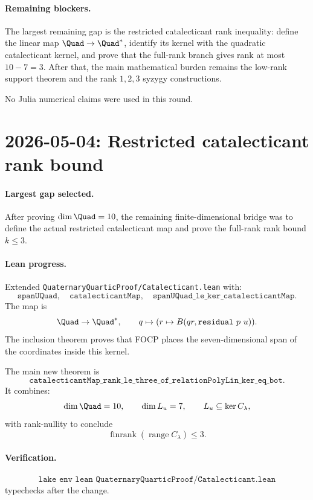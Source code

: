 \documentclass[11pt]{article}
\begin{document}
\paragraph{Remaining blockers.}
The largest remaining gap is the restricted catalecticant rank inequality:
define the linear map \(\Quad\to\Quad^\ast\), identify its kernel with the
quadratic catalecticant kernel, and prove that the full-rank branch gives
rank at most \(10-7=3\).  After that, the main mathematical burden remains
the low-rank support theorem and the rank \(1,2,3\) syzygy constructions.

No Julia numerical claims were used in this round.

\section*{2026-05-04: Restricted catalecticant rank bound}

\paragraph{Largest gap selected.}
After proving \(\dim \Quad=10\), the remaining finite-dimensional bridge was
to define the actual restricted catalecticant map and prove the full-rank
rank bound \(k\le3\).

\paragraph{Lean progress.}
Extended \texttt{QuaternaryQuarticProof/Catalecticant.lean} with:
\[
\texttt{spanUQuad},\quad
\texttt{catalecticantMap},\quad
\texttt{spanUQuad\_le\_ker\_catalecticantMap}.
\]
The map is
\[
  \Quad\to\Quad^\ast,\qquad
  q\mapsto(r\mapsto B(qr,\texttt{residual}\ p\ u)).
\]
The inclusion theorem proves that FOCP places the seven-dimensional span of
the coordinates inside this kernel.

The main new theorem is
\[
\texttt{catalecticantMap\_rank\_le\_three\_of\_relationPolyLin\_ker\_eq\_bot}.
\]
It combines:
\[
\dim \Quad=10,\qquad
\dim L_u=7,\qquad
L_u\subseteq\ker C_\lambda,
\]
with rank-nullity to conclude
\[
  \operatorname{finrank}(\operatorname{range} C_\lambda)\le3.
\]

\paragraph{Verification.}
\[
\texttt{lake env lean QuaternaryQuarticProof/Catalecticant.lean}
\]
typechecks after the change.
\end{document}
